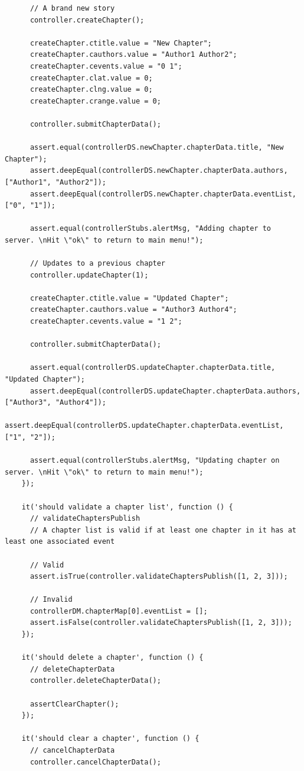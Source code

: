 \documentclass[12pt]{ucthesis}
\begin{document}
\begin{lstlisting}
      // A brand new story
      controller.createChapter();

      createChapter.ctitle.value = "New Chapter";
      createChapter.cauthors.value = "Author1 Author2";
      createChapter.cevents.value = "0 1";
      createChapter.clat.value = 0;
      createChapter.clng.value = 0;
      createChapter.crange.value = 0;

      controller.submitChapterData();

      assert.equal(controllerDS.newChapter.chapterData.title, "New Chapter");
      assert.deepEqual(controllerDS.newChapter.chapterData.authors, ["Author1", "Author2"]);
      assert.deepEqual(controllerDS.newChapter.chapterData.eventList, ["0", "1"]);

      assert.equal(controllerStubs.alertMsg, "Adding chapter to server. \nHit \"ok\" to return to main menu!");

      // Updates to a previous chapter
      controller.updateChapter(1);

      createChapter.ctitle.value = "Updated Chapter";
      createChapter.cauthors.value = "Author3 Author4";
      createChapter.cevents.value = "1 2";  

      controller.submitChapterData();

      assert.equal(controllerDS.updateChapter.chapterData.title, "Updated Chapter");
      assert.deepEqual(controllerDS.updateChapter.chapterData.authors, ["Author3", "Author4"]);
      assert.deepEqual(controllerDS.updateChapter.chapterData.eventList, ["1", "2"]);

      assert.equal(controllerStubs.alertMsg, "Updating chapter on server. \nHit \"ok\" to return to main menu!");
    });

    it('should validate a chapter list', function () {
      // validateChaptersPublish
      // A chapter list is valid if at least one chapter in it has at least one associated event

      // Valid
      assert.isTrue(controller.validateChaptersPublish([1, 2, 3]));

      // Invalid
      controllerDM.chapterMap[0].eventList = [];
      assert.isFalse(controller.validateChaptersPublish([1, 2, 3]));
    });

    it('should delete a chapter', function () {
      // deleteChapterData
      controller.deleteChapterData();

      assertClearChapter();
    });

    it('should clear a chapter', function () {
      // cancelChapterData
      controller.cancelChapterData();


\end{lstlisting}
\end{document}
